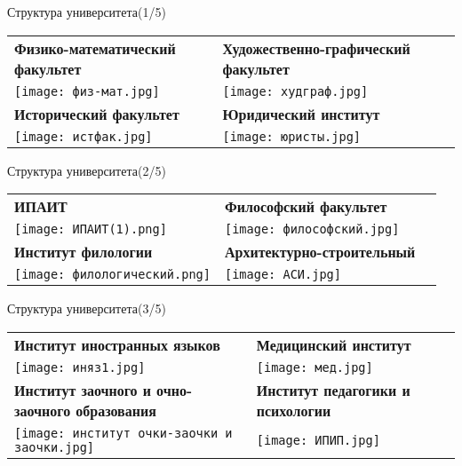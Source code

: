 \documentclass{beamer}
\begin{document}
\begin{frame}{Структура университета(1/5)}
\centering
\setlength{\tabcolsep}{10pt} %

\begin{tabular}{ >{\RaggedRight\arraybackslash}p{4.5cm} >{\centering\arraybackslash}p{4.5cm} >{\RaggedRight\arraybackslash}p{4.5cm} }
\textbf{Физико-математический факультет} & \textbf{Художественно-графический факультет} \\
\texttt{[image: физ-мат.jpg]} & \texttt{[image: худграф.jpg]} \\
\textbf{Исторический факультет} & \textbf{Юридический институт} \\
\texttt{[image: истфак.jpg]} & \texttt{[image: юристы.jpg]} \\
\end{tabular}

\end{frame}

\begin{frame}{Структура университета(2/5)}
\centering
\setlength{\tabcolsep}{10pt} %

\begin{tabular}{ >{\RaggedRight\arraybackslash}p{4.5cm} >{\centering\arraybackslash}p{4.5cm} >{\RaggedRight\arraybackslash}p{4.5cm} }
\textbf{ИПАИТ} & \textbf{Философский факультет} \\
\texttt{[image: ИПАИТ(1).png]} & \texttt{[image: философский.jpg]} \\
\textbf{Институт филологии} & \textbf{Архитектурно-строительный} \\
\texttt{[image: филологический.png]} & \texttt{[image: АСИ.jpg]} \\
\end{tabular}

\end{frame}

\begin{frame}{Структура университета(3/5)}
\centering
\setlength{\tabcolsep}{10pt} %

\begin{tabular}{ >{\RaggedRight\arraybackslash}p{4.5cm} >{\centering\arraybackslash}p{4.5cm} >{\RaggedRight\arraybackslash}p{4.5cm} }
\textbf{Институт иностранных языков} & \textbf{Медицинский институт} \\
\texttt{[image: иняз1.jpg]} & \texttt{[image: мед.jpg]} \\
\textbf{Институт заочного и очно-заочного образования} & \textbf{Институт педагогики и психологии} \\
\texttt{[image: институт очки-заочки и заочки.jpg]} & \texttt{[image: ИПИП.jpg]} \\
\end{tabular}

\end{frame}
\end{document}
